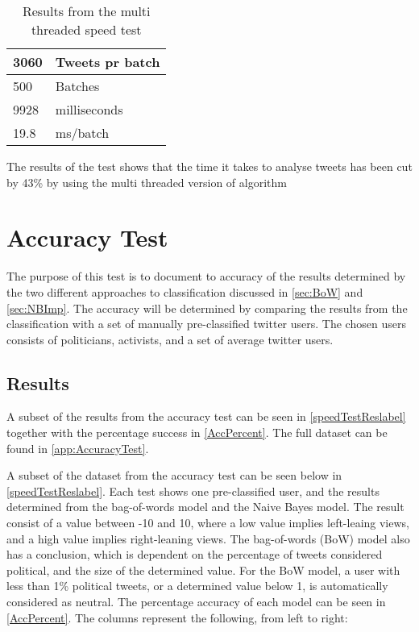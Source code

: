 \begin{table}[H]\centering
\begin{tabular}{|l|l|}
\hline
3060	&	Tweets pr batch 	\\\hline
500		&	Batches				\\\hline
9928 	&	milliseconds		\\\hline
19.8	&	ms/batch 			\\\hline
\end{tabular}
\caption{Results from the multi threaded speed test}
\label{speedTestResMultiThread}
\end{table}

The results of the test shows that the time it takes to analyse tweets has been
cut by 43\% by using the multi threaded version of algorithm 

\section{Accuracy Test}
The purpose of this test is to document to accuracy of the results determined
by the two different approaches to classification discussed in \autoref{sec:BoW}
and \autoref{sec:NBImp}. The accuracy will be determined by comparing the
results from the classification with a set of manually pre-classified
twitter users. The chosen users consists of politicians, activists, and a set of
average twitter users.

\subsection*{Results}
A subset of the results from the accuracy test can be seen in
\autoref{speedTestReslabel} together with the percentage success in
\autoref{AccPercent}. The full dataset can be found in
\autoref{app:AccuracyTest}.\nl

A subset of the dataset from the accuracy test can be seen below in
\autoref{speedTestReslabel}. Each test shows one pre-classified user, and the
results determined from the bag-of-words model and the Naive Bayes model. The
result consist of a value between -10 and 10, where a low value implies
left-leaing views, and a high value implies right-leaning views. The
bag-of-words (BoW) model also has a conclusion, which is dependent on the
percentage of tweets considered political, and the size of the determined value.
For the BoW model, a user with less than 1\% political tweets, or a determined
value below 1, is automatically considered as neutral. The percentage accuracy
of each model can be seen in \autoref{AccPercent}.
The columns represent the following, from left to right:\nl

